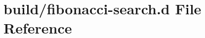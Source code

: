 \hypertarget{fibonacci-search_8d}{}\section{build/fibonacci-\/search.d File Reference}
\label{fibonacci-search_8d}
